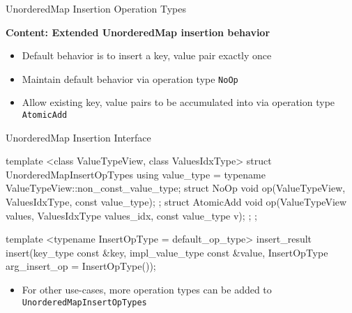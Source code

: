 

\begin{frame}[fragile]

  {\Huge UnorderedMap Insertion Operation Types}

  \vspace{10pt}

  \textbf{Content: Extended UnorderedMap insertion behavior}
  \begin{itemize}
    \item Default behavior is to insert a key, value pair exactly once
    \item Maintain default behavior via operation type \texttt{NoOp}
    \item Allow existing key, value pairs to be accumulated into via operation type \texttt{AtomicAdd}
  \end{itemize}

\end{frame}


\begin{frame}[fragile]{UnorderedMap Insertion Interface}

\begin{code}[keywords={UnorderedMap Insertion Operation Types}]
template <class ValueTypeView, class ValuesIdxType>
struct UnorderedMapInsertOpTypes {
  using value_type = typename ValueTypeView::non_const_value_type;
  struct NoOp {
    void op(ValueTypeView, ValuesIdxType, const value_type);
  };
  struct AtomicAdd {
    void op(ValueTypeView values, ValuesIdxType values_idx,
            const value_type v);
  };
};
\end{code}

\begin{code}[keywords={UnorderedMap Insertion Interface}]
template <typename InsertOpType = default_op_type>
insert_result insert(key_type const &key,
                     impl_value_type const &value,
                     InsertOpType arg_insert_op = InsertOpType());
\end{code}

\begin{itemize}
  \item For other use-cases, more operation types can be added to \texttt{UnorderedMapInsertOpTypes}
\end{itemize}

\end{frame}


